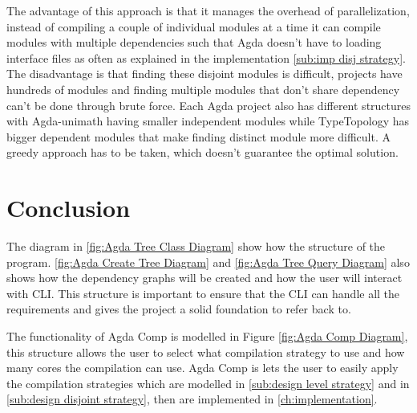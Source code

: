 The advantage of this approach is that it manages the overhead of
parallelization, instead of compiling a couple of individual modules at a time
it can compile modules with multiple dependencies such that Agda doesn't have
to loading interface files as often as explained in the implementation
\cref{sub:imp disj strategy}. The disadvantage is that finding these disjoint
modules is difficult, projects  have hundreds of modules and finding multiple
modules that don't share dependency can't be done through brute force. Each
Agda project also has different structures with Agda-unimath
\cite{agda-unimath} having smaller independent modules while TypeTopology
\cite{type-topology} has bigger dependent modules that make finding distinct
module more difficult. A greedy approach has to be taken, which doesn't
guarantee the optimal solution.



\pagebreak

\section{Conclusion}

The diagram in \cref{fig:Agda Tree Class Diagram} show how the structure of the
program. \cref{fig:Agda Create Tree Diagram} and \cref{fig:Agda Tree Query Diagram} also shows how the dependency graphs will be created and how the user
will interact with CLI. This structure is important to ensure that the
CLI can handle all the requirements and gives the project a solid foundation to
refer back to. 

The functionality of Agda Comp is modelled in Figure \cref{fig:Agda Comp Diagram}, this structure allows the user to select what compilation strategy to
use and how many cores the compilation can use. Agda Comp is lets the user to
easily apply the compilation strategies which are modelled in \cref{sub:design level strategy} and in \cref{sub:design disjoint strategy}, then are
implemented in \cref{ch:implementation}.

